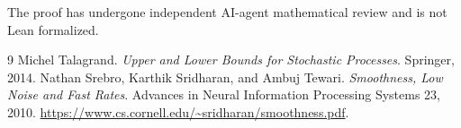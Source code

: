 \documentclass[11pt]{article}
\begin{document}








The proof has undergone independent AI-agent mathematical review and is not Lean formalized.
\begin{thebibliography}{9}
 Michel Talagrand. \emph{Upper and Lower Bounds for Stochastic Processes}. Springer, 2014.
 Nathan Srebro, Karthik Sridharan, and Ambuj Tewari. \emph{Smoothness, Low Noise and Fast Rates}. Advances in Neural Information Processing Systems 23, 2010. \url{https://www.cs.cornell.edu/~sridharan/smoothness.pdf}.
\end{thebibliography}
\end{document}
